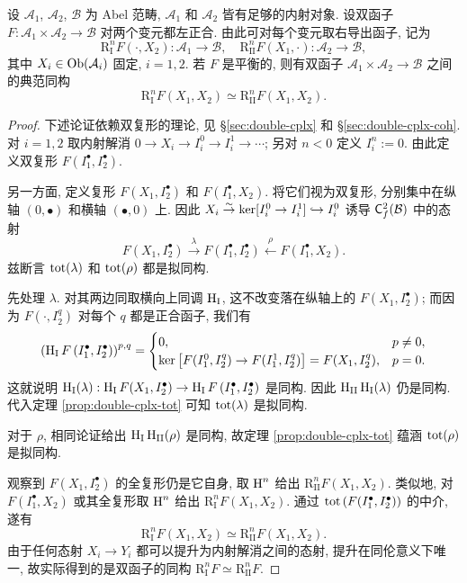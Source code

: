 \begin{theorem}\label{prop:balanced-primer}
	设 $\mathcal{A}_1$, $\mathcal{A}_2$, $\mathcal{B}$ 为 Abel 范畴, $\mathcal{A}_1$ 和 $\mathcal{A}_2$ 皆有足够的内射对象. 设双函子 $F: \mathcal{A}_1 \times \mathcal{A}_2 \to \mathcal{B}$ 对两个变元都左正合. 由此可对每个变元取右导出函子, 记为
	\[ \mathrm{R}_{\mathrm{I}}^n F(\cdot, X_2): \mathcal{A}_1 \to \mathcal{B}, \quad \mathrm{R}_{\mathrm{II}}^n F(X_1, \cdot): \mathcal{A}_2 \to \mathcal{B} , \]
	其中 $X_i \in \operatorname{Ob}(\mathcal{A}_i)$ 固定, $i=1,2$. 若 $F$ 是平衡的, 则有双函子 $\mathcal{A}_1 \times \mathcal{A}_2 \to \mathcal{B}$ 之间的典范同构
	\[ \mathrm{R}_{\mathrm{I}}^n F(X_1, X_2) \simeq \mathrm{R}_{\mathrm{II}}^n F(X_1, X_2). \]
\end{theorem}
\begin{proof}
	下述论证依赖双复形的理论, 见 \S\ref{sec:double-cplx} 和 \S\ref{sec:double-cplx-coh}. 对 $i = 1, 2$ 取内射解消 $0 \to X_i \to I_i^0 \to I_i^1 \to \cdots$; 另对 $n < 0$ 定义 $I_i^n := 0$. 由此定义双复形 $F\left(I_1^\bullet, I_2^\bullet\right)$.
	
	另一方面, 定义复形 $F(X_1, I_2^\bullet)$ 和 $F(I_1^\bullet, X_2)$. 将它们视为双复形, 分别集中在纵轴 $(0, \bullet)$ 和横轴 $(\bullet, 0)$ 上. 因此 $X_i \stackrel{\sim}{\rightarrow} \operatorname{ker}[I_i^0 \to I_i^1] \hookrightarrow I_i^0$ 诱导 $\mathsf{C}^2_f(\mathcal{B})$ 中的态射
	\[ F(X_1, I_2^\bullet) \xrightarrow{\lambda} F\left(I_1^\bullet, I_2^\bullet\right) \xleftarrow{\rho} F(I_1^\bullet, X_2). \]
	兹断言 $\operatorname{tot}(\lambda)$ 和 $\operatorname{tot}(\rho)$ 都是拟同构.
	
	先处理 $\lambda$. 对其两边同取横向上同调 $\operatorname{H}_{\mathrm{I}}$, 这不改变落在纵轴上的 $F(X_1, I_2^\bullet)$; 而因为 $F(\cdot, I_2^q)$ 对每个 $q$ 都是正合函子, 我们有
	\[ \left( \operatorname{H}_{\mathrm{I}} F\left(I_1^\bullet, I_2^\bullet\right)\right)^{p,q} = \begin{cases}
		0, & p \neq 0, \\
		\operatorname{ker}\left[F(I_1^0, I_2^q) \to F(I_1^1, I_2^q) \right] = F(X_1, I_2^q), & p = 0.
	\end{cases}\]
	这就说明 $\operatorname{H}_{\mathrm{I}}(\lambda): \operatorname{H}_{\mathrm{I}} F(X_1, I_2^\bullet) \to \operatorname{H}_{\mathrm{I}} F\left(I_1^\bullet, I_2^\bullet\right)$ 是同构. 因此 $\operatorname{H}_{\mathrm{II}} \operatorname{H}_{\mathrm{I}}(\lambda)$ 仍是同构. 代入定理 \ref{prop:double-cplx-tot} 可知 $\operatorname{tot}(\lambda)$ 是拟同构.
	
	对于 $\rho$, 相同论证给出 $\operatorname{H}_{\mathrm{I}} \operatorname{H}_{\mathrm{II}}(\rho)$ 是同构, 故定理 \ref{prop:double-cplx-tot} 蕴涵 $\operatorname{tot}(\rho)$ 是拟同构.
	
	观察到 $F(X_1, I_2^\bullet)$ 的全复形仍是它自身, 取 $\operatorname{H}^n$ 给出 $\mathrm{R}_{\mathrm{II}}^n F(X_1, X_2)$. 类似地, 对 $F(I_1^\bullet, X_2)$ 或其全复形取 $\operatorname{H}^n$ 给出 $\mathrm{R}_{\mathrm{I}}^n F(X_1, X_2)$. 通过 $\operatorname{tot}\left(F(I_1^\bullet, I_2^\bullet)\right)$ 的中介, 遂有
	\[ \mathrm{R}_{\mathrm{I}}^n F(X_1, X_2) \simeq \mathrm{R}_{\mathrm{II}}^n F(X_1, X_2). \]
	由于任何态射 $X_i \to Y_i$ 都可以提升为内射解消之间的态射, 提升在同伦意义下唯一, 故实际得到的是双函子的同构 $\mathrm{R}_{\mathrm{I}}^n F \simeq \mathrm{R}_{\mathrm{II}}^n F$.
\end{proof}

